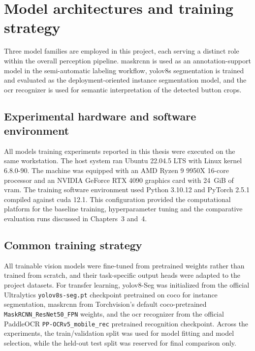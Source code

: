 \section{Model architectures and training strategy}

Three model families are employed in this project, each serving a distinct role
within the overall perception pipeline. \gls{maskrcnn} is used as an
annotation-support model in the semi-automatic labeling workflow,
\gls{yolo}v8s segmentation is trained and evaluated as the deployment-oriented instance
segmentation model, and the \gls{ocr} recognizer is used for semantic
interpretation of the detected button crops.

\subsection{Experimental hardware and software environment}

All models training experiments reported in this thesis were executed
on the same workstation. The host system ran Ubuntu 22.04.5 LTS with Linux kernel
6.8.0-90. The machine was equipped with an AMD Ryzen 9 9950X 16-core processor and an NVIDIA GeForce RTX 4090 graphics card with
24~GiB of \gls{vram}. The training software environment used Python 3.10.12 and
PyTorch 2.5.1 compiled against \gls{cuda} 12.1. This configuration provided the
computational platform for the baseline training, hyperparameter tuning and the comparative evaluation runs discussed in Chapters~3 and~4.

\subsection{Common training strategy}

All trainable vision models were fine-tuned from pretrained weights rather than
trained from scratch, and their task-specific output heads were adapted to the
project datasets. For transfer learning, \gls{yolo}v8-Seg was initialized from
the official Ultralytics \texttt{yolov8s-seg.pt} checkpoint pretrained on
\gls{coco} for instance segmentation, \gls{maskrcnn} from Torchvision's default
\gls{coco}-pretrained \texttt{MaskRCNN\_ResNet50\_FPN} weights, and the \gls{ocr}
recognizer from the official PaddleOCR \texttt{PP-OCRv5\_mobile\_rec}
pretrained recognition checkpoint. Across the experiments, the train/validation
split was used for model fitting and model selection, while the held-out test
split was reserved for final comparison only.

